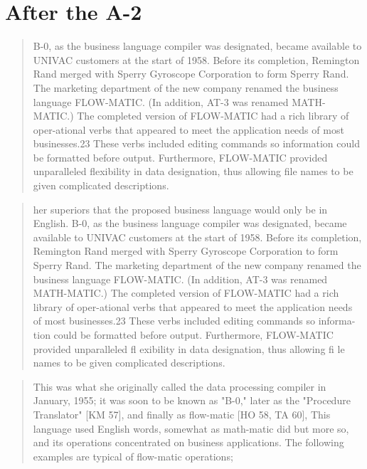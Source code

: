 
\section{After the A-2}


\begin{quotation}
B-0, as the business language compiler was designated, became available to 
UNIVAC customers at the start of 1958. Before its completion, Remington Rand 
merged with Sperry Gyroscope Corporation to form Sperry Rand. The marketing 
department of the new company renamed the business language FLOW-MATIC. (In 
addition, AT-3 was renamed MATH-MATIC.) The completed version of FLOW-MATIC had 
a rich library of oper-ational verbs that appeared to meet the application 
needs of most businesses.23 These verbs included editing commands so 
information could be formatted before output. Furthermore, FLOW-MATIC provided 
unparalleled flexibility in data designation, thus allowing file names to be 
given complicated descriptions.
\end{quotation}

\begin{quotation}
her superiors that the proposed business language would only be in English.  
B-0, as the business language compiler was designated, became available to 
UNIVAC customers at the start of 1958. Before its completion, Remington Rand 
merged with Sperry Gyroscope Corporation to form Sperry Rand. The marketing 
department of the new company renamed the business language FLOW-MATIC. (In 
addition, AT-3 was renamed MATH-MATIC.) The completed version of FLOW-MATIC had 
a rich library of oper-ational verbs that appeared to meet the application 
needs of most businesses.23 These verbs included editing commands so 
informa-tion could be formatted before output. Furthermore, FLOW-MATIC provided 
unparalleled fl exibility in data designation, thus allowing fi le names to be 
given complicated descriptions.
\end{quotation}

\begin{quotation}
This was what she originally called the data processing compiler in January, 
1955; it was soon to be known as "B-0," later as the "Procedure Translator" [KM 
57], and finally as flow-matic [HO 58, TA 60], This language used English 
words, somewhat as math-matic did but more so, and its operations concentrated 
on business applications. The following examples are typical of flow-matic 
operations;
\cite{history_of_computing_in_the_twentieth_century_1980}
\end{quotation}

